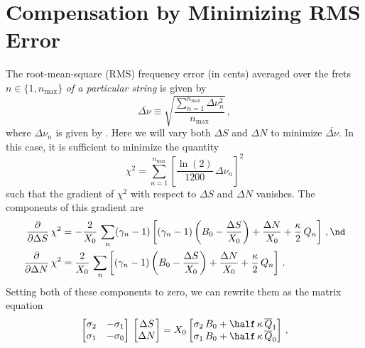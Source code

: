 %
%
%

 \section{Compensation by Minimizing RMS Error\label{app:rms}}

The root-mean-square (RMS) frequency error (in cents) averaged over the frets $n \in \{1, n_\text{max}\}$ \emph{of a particular string} is given by
 \begin{equation}\label{eqn:rms_def}
\overline{\Delta \nu} \equiv \sqrt{\frac{\sum_{n = 1}^{n_\text{max}} \Delta \nu_n^2}{n_\text{max}}}\, ,
 \end{equation}
where $\Delta \nu_n$ is given by . Here we will vary both $\Delta S$ and $\Delta N$ to minimize $\overline{\Delta \nu}$. In this case, it is sufficient to minimize the quantity
 \begin{equation}\label{eqn:chi2_def}
\chi^2 = \sum_{n = 1}^{n_\text{max}} \left[\frac{\ln(2)}{1200}\, \Delta \nu_n\right]^2
 \end{equation}
such that the gradient of $\chi^2$ with respect to $\Delta S$ and $\Delta N$ vanishes. The components of this gradient are
 \begin{subequations}\label{chi2_grad}
 \begin{align}
\frac{\partial}{\partial \Delta S}\, \chi^2 &= -\frac{2}{X_0}\, \sum_n (\gamma_n - 1)\left[ (\gamma_n - 1) \left(B_0 - \frac{\Delta S}{X_0}\right) + \frac{\Delta N}{X_0} + \frac{\kappa}{2}\, Q_n \right]\, , \nd \\
\frac{\partial}{\partial \Delta N}\, \chi^2 &= \frac{2}{X_0}\, \sum_n \left[ (\gamma_n - 1) \left(B_0 - \frac{\Delta S}{X_0}\right) + \frac{\Delta N}{X_0} + \frac{\kappa}{2}\, Q_n \right]\, .
 \end{align}
 \end{subequations}
Setting both of these components to zero, we can rewrite them as the matrix equation
 \begin{equation} \label{eqn:rms_mat}
\begin{bmatrix}
  \sigma_2 & -\sigma_1 \\
  \sigma_1 & -\sigma_0
\end{bmatrix}\,
\begin{bmatrix}
  \Delta S \\
  \Delta N
\end{bmatrix} = X_0
\begin{bmatrix}
  \sigma_2\, B_0 +  \half\, \kappa\, \overline{Q}_1 \\
  \sigma_1\, B_0 +  \half\, \kappa\, \overline{Q}_0
\end{bmatrix}\, ,
 \end{equation}
